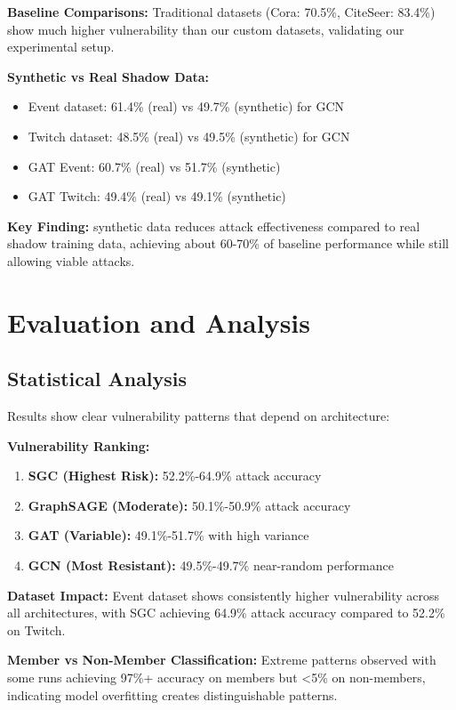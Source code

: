 \documentclass{article}
\begin{document}
\textbf{Baseline Comparisons:} Traditional datasets (Cora: 70.5\%, CiteSeer: 83.4\%) show much higher vulnerability than our custom datasets, validating our experimental setup.

\textbf{Synthetic vs Real Shadow Data:}
\begin{itemize}
\item Event dataset: 61.4\% (real) vs 49.7\% (synthetic) for GCN
\item Twitch dataset: 48.5\% (real) vs 49.5\% (synthetic) for GCN
\item GAT Event: 60.7\% (real) vs 51.7\% (synthetic)
\item GAT Twitch: 49.4\% (real) vs 49.1\% (synthetic)
\end{itemize}

\textbf{Key Finding:} synthetic data reduces attack effectiveness compared to real shadow training data, achieving about 60-70\% of baseline performance while still allowing viable attacks.

\section{Evaluation and Analysis}
\subsection{Statistical Analysis}
Results show clear vulnerability patterns that depend on architecture:

\textbf{Vulnerability Ranking:}
\begin{enumerate}
\item \textbf{SGC (Highest Risk):} 52.2\%-64.9\% attack accuracy
\item \textbf{GraphSAGE (Moderate):} 50.1\%-50.9\% attack accuracy  
\item \textbf{GAT (Variable):} 49.1\%-51.7\% with high variance
\item \textbf{GCN (Most Resistant):} 49.5\%-49.7\% near-random performance
\end{enumerate}

\textbf{Dataset Impact:} Event dataset shows consistently higher vulnerability across all architectures, with SGC achieving 64.9\% attack accuracy compared to 52.2\% on Twitch.

\textbf{Member vs Non-Member Classification:} Extreme patterns observed with some runs achieving 97\%+ accuracy on members but <5\% on non-members, indicating model overfitting creates distinguishable patterns.
\end{document}
